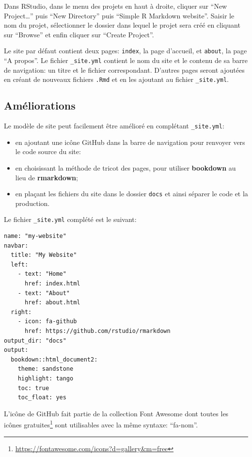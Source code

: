 \documentclass[
  12pt,
  french,
  a4paper,
  extrafontsizes,onecolumn,openright
  ]{memoir}
\providecommand{\tightlist}{%
  \setlength{\itemsep}{0pt}\setlength{\parskip}{0pt}}
\begin{document}
Dans RStudio, dans le menu des projets en haut à droite, cliquer sur \enquote{New Project\ldots{}} puis \enquote{New Directory} puis \enquote{Simple R Markdown website}.
Saisir le nom du projet, sélectionner le dossier dans lequel le projet sera créé en cliquant sur \enquote{Browse} et enfin cliquer sur \enquote{Create Project}.

Le site par défaut contient deux pages: \texttt{index}, la page d'accueil, et \texttt{about}, la page \enquote{A propos}.
Le fichier \texttt{\_site.yml} contient le nom du site et le contenu de sa barre de navigation: un titre et le fichier correspondant.
D'autres pages seront ajoutées en créant de nouveaux fichiers \texttt{.Rmd} et en les ajoutant au fichier \texttt{\_site.yml}.

\hypertarget{amuxe9liorations}{%
\subsection{Améliorations}\label{amuxe9liorations}}

Le modèle de site peut facilement être amélioré en complétant \texttt{\_site.yml}:

\begin{itemize}
\tightlist
\item
  en ajoutant une icône GitHub dans la barre de navigation pour renvoyer vers le code source du site:
\item
  en choisissant la méthode de tricot des pages, pour utiliser \textbf{bookdown} au lieu de \textbf{rmarkdown};
\item
  en plaçant les fichiers du site dans le dossier \texttt{docs} et ainsi séparer le code et la production.
\end{itemize}

Le fichier \texttt{\_site.yml} complété est le suivant:

\begin{verbatim}
name: "my-website"
navbar:
  title: "My Website"
  left:
    - text: "Home"
      href: index.html
    - text: "About"
      href: about.html
  right:
    - icon: fa-github
      href: https://github.com/rstudio/rmarkdown
output_dir: "docs"
output:
  bookdown::html_document2:
    theme: sandstone
    highlight: tango
    toc: true
    toc_float: yes
\end{verbatim}

L'icône de GitHub fait partie de la collection Font Awesome dont toutes les icônes gratuites\footnote{\url{https://fontawesome.com/icons?d=gallery\&m=free}} sont utilisables avec la même syntaxe: \enquote{fa-nom}.
\end{document}
